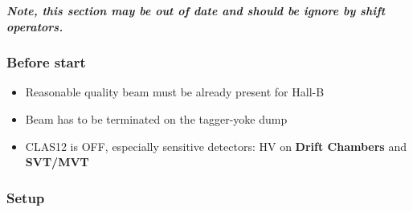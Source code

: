 {\bf\em Note, this section may be out of date and should be ignore by shift operators.}

\subsubsection{Before start}

\begin{itemize}
\item Reasonable quality beam must be already present for Hall-B
\item Beam has to be terminated on the tagger-yoke dump
\item CLAS12 is OFF, especially sensitive detectors: HV on \textbf{Drift Chambers} and \textbf{SVT/MVT}
\end{itemize}


\subsubsection{Setup }

